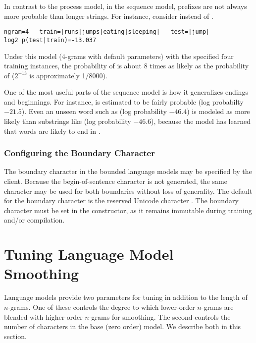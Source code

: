 In contrast to the process model, in the sequence model, prefixes
are not always more probable than longer strings.  For
instance, consider  instead of .
%
\begin{verbatim}
ngram=4   train=|runs|jumps|eating|sleeping|   test=|jump|
log2 p(test|train)=-13.037
\end{verbatim}
%
Under this model (4-grams with default parameters) with the specified
four training instances, the probability of  is
about 8 times as likely as the probability of 
($2^{-13}$ is approximately 1/8000).

One of the most useful parts of the sequence model is how it
generalizes endings and beginnings.  For instance,
 is estimated to be fairly probable (log
probabilty $-21.5$).  Even an unseen word such as
 (log probability $-46.4$) is modeled as more
likely than substrings like  (log probability
$-46.6$), because the model has learned that words are likely to end in
. 


\subsubsection{Configuring the Boundary Character}

The boundary character in the bounded language models may be specified
by the client.  Because the begin-of-sentence character is not
generated, the same character may be used for both boundaries without
loss of generality.  The default for the boundary character is the
reserved Unicode character .  The boundary character
must be set in the constructor, as it remains immutable during
training and/or compilation.


\section{Tuning Language Model Smoothing}\label{section:char-lm-smoothing}

Language models provide two parameters for tuning in addition to the
length of $n$-grams.  One of these controls the degree to which
lower-order $n$-grams are blended with higher-order $n$-grams for
smoothing.  The second controls the number of characters in the base
(zero order) model.  We describe both in this section.

